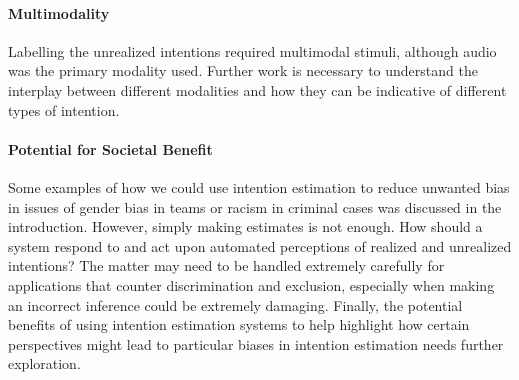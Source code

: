 \documentclass[manuscript,screen,review]{acmart}
\begin{document}

\paragraph {Multimodality}
Labelling the unrealized intentions required multimodal stimuli, although audio was the primary modality used. Further work is necessary to understand the interplay between different modalities and how they can be indicative of different types of intention. 


\paragraph {Potential for Societal Benefit} 
Some examples of how we could use intention estimation to reduce unwanted bias in issues of gender bias in teams or racism in criminal cases was discussed in the introduction. However, simply making estimates is not enough. How should a system respond to and act upon automated perceptions of realized and unrealized intentions? The matter may need to be handled extremely carefully for applications that counter discrimination and exclusion, especially when making an incorrect inference could be extremely damaging. Finally, the potential benefits of using intention estimation systems to help highlight how certain perspectives might lead to particular biases in intention estimation needs further exploration.


\end{document}
